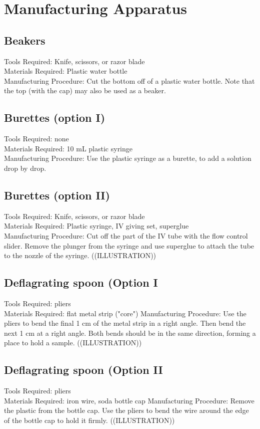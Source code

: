 \section{Manufacturing Apparatus}

\subsection{Beakers}
Tools Required: Knife, scissors, or razor blade\\
Materials Required: Plastic water bottle\\
Manufacturing Procedure: Cut the bottom off of a plastic water bottle. Note that the top (with the cap) may also be used as a beaker.

\subsection{Burettes (option I)}
Tools Required: none\\
Materials Required: 10 mL plastic syringe\\
Manufacturing Procedure: Use the plastic syringe as a burette, to add a solution drop by drop.

\subsection{Burettes (option II)}
Tools Required: Knife, scissors, or razor blade\\
Materials Required: Plastic syringe, IV giving set, superglue\\
Manufacturing Procedure: Cut off the part of the IV tube with the flow control slider. Remove the plunger from the syringe and use superglue to attach the tube to the nozzle of the syringe. ((ILLUSTRATION))

\subsection{Deflagrating spoon (Option I}
Tools Required: pliers\\
Materials Required: flat metal strip ("core")
Manufacturing Procedure: Use the pliers to bend the final 1 cm of the metal strip in a right angle. Then bend the next 1 cm at a right angle. Both bends should be in the same direction, forming a place to hold a sample. ((ILLUSTRATION))

\subsection{Deflagrating spoon (Option II}
Tools Required: pliers\\
Materials Required: iron wire, soda bottle cap
Manufacturing Procedure: Remove the plastic from the bottle cap. Use the pliers to bend the wire around the edge of the bottle cap to hold it firmly. ((ILLUSTRATION))

